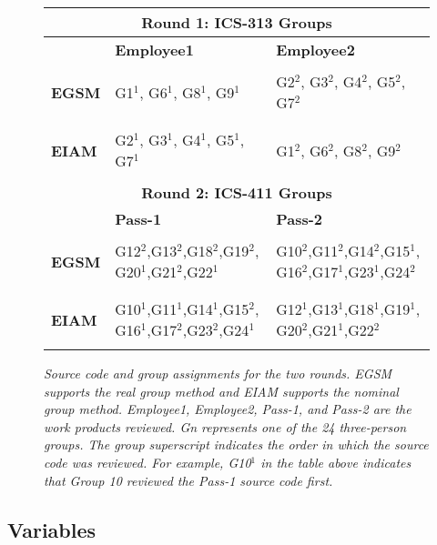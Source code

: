 \begin{figure}[htb]
    \small
  \begin{center}
    \begin{tabular} {|l|p{2.5in}|p{2.5in}|}
      \multicolumn{3}{c}{{\bf Round 1: ICS-313 Groups}}\\
      \hline
      & {\bf Employee1} & {\bf Employee2}\\
      \hline
      & & \\
      {\bf EGSM} & G1$^1$, G6$^1$, G8$^1$, G9$^1$ & G2$^2$, G3$^2$, G4$^2$, G5$^2$, G7$^2$ \\
      & & \\
      \hline
      & & \\
      {\bf EIAM} & G2$^1$, G3$^1$, G4$^1$, G5$^1$, G7$^1$ & G1$^2$, G6$^2$, G8$^2$, G9$^2$ \\
      & &  \\
      \hline
      \multicolumn{3}{c}{{\bf Round 2: ICS-411 Groups}}\\
      \hline
      & {\bf Pass-1} & {\bf Pass-2}\\
      \hline
      & & \\
      {\bf EGSM} & G12$^2$,G13$^2$,G18$^2$,G19$^2$, G20$^1$,G21$^2$,G22$^1$ & G10$^2$,G11$^2$,G14$^2$,G15$^1$, G16$^2$,G17$^1$,G23$^1$,G24$^2$\\
      & & \\
      \hline
      & & \\
      {\bf EIAM} & G10$^1$,G11$^1$,G14$^1$,G15$^2$,
      G16$^1$,G17$^2$,G23$^2$,G24$^1$ & G12$^1$,G13$^1$,G18$^1$,G19$^1$, G20$^2$,G21$^1$,G22$^2$ \\
      & &  \\
      \hline
     \end{tabular}
  \end{center}
  \caption{{\em Source code and group assignments for the two rounds. 
           EGSM supports the real group method and EIAM supports the 
           nominal group method.
           Employee1, Employee2, Pass-1, and Pass-2 are the work products reviewed.
           G{\em n}  represents one of the 24 three-person groups. 
           The group superscript indicates the order in which the source code was
           reviewed. For example, G10$^1$ in the table above indicates that
           Group 10 reviewed the Pass-1 source code first. }
         }


  \label{design}
  \normalsize
\end{figure}

\subsection{Variables}

